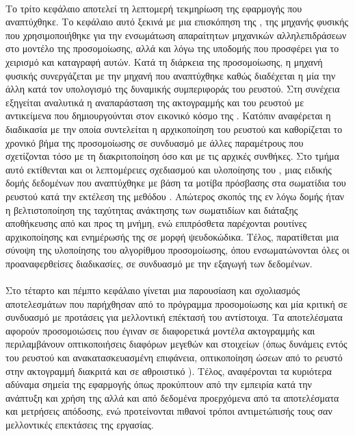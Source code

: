 \paragraph{} Το τρίτο κεφάλαιο αποτελεί τη λεπτομερή τεκμηρίωση της εφαρμογής που
αναπτύχθηκε. Το κεφάλαιο αυτό ξεκινά με μια επισκόπηση της , της μηχανής
φυσικής που χρησιμοποιήθηκε για την ενσωμάτωση απαραίτητων μηχανικών αλληλεπιδράσεων στο
μοντέλο της προσομοίωσης, αλλά και λόγω της υποδομής που προσφέρει για το χειρισμό και
καταγραφή αυτών. Κατά τη διάρκεια της προσομοίωσης, η μηχανή φυσικής συνεργάζεται με την
μηχανή  που αναπτύχθηκε καθώς διαδέχεται η μία την άλλη κατά τον υπολογισμό της
δυναμικής συμπεριφοράς του ρευστού. Στη συνέχεια εξηγείται αναλυτικά η αναπαράσταση της
ακτογραμμής και του ρευστού με αντικείμενα που δημιουργούνται στον εικονικό κόσμο της
. Κατόπιν αναφέρεται η διαδικασία με την οποία συντελείται η αρχικοποίηση του
ρευστού και καθορίζεται το χρονικό βήμα της προσομοίωσης σε συνδυασμό με άλλες παραμέτρους
που σχετίζονται τόσο με τη διακριτοποίηση όσο και με τις αρχικές συνθήκες. Στο τμήμα αυτό
εκτίθενται και οι λεπτομέρειες σχεδιασμού και υλοποίησης του , μιας ειδικής
δομής δεδομένων που αναπτύχθηκε με βάση τα μοτίβα πρόσβασης στα σωματίδια του ρευστού κατά
την εκτέλεση της μεθόδου . Απώτερος σκοπός της εν λόγω δομής ήταν η
βελτιστοποίηση της ταχύτητας ανάκτησης των σωματιδίων και διάταξης αποθήκευσης από και
προς τη μνήμη, ενώ επιπρόσθετα παρέχονται ρουτίνες αρχικοποίησης και ενημέρωσής της σε
μορφή ψευδοκώδικα. Τέλος, παρατίθεται μια σύνοψη της υλοποίησης του αλγορίθμου
προσομοίωσης, όπου ενσωματώνονται όλες οι προαναφερθείσες διαδικασίες, σε συνδυασμό με την
εξαγωγή των δεδομένων.

\paragraph{} Στο τέταρτο και πέμπτο κεφάλαιο γίνεται μια παρουσίαση και σχολιασμός
αποτελεσμάτων που παρήχθησαν από το πρόγραμμα προσομοίωσης και μία κριτική σε συνδυασμό με
προτάσεις για μελλοντική επέκτασή του αντίστοιχα. Τα αποτελέσματα αφορούν προσομοιώσεις
που έγιναν σε διαφορετικά μοντέλα ακτογραμμής και περιλαμβάνουν οπτικοποιήσεις διαφόρων
μεγεθών και στοιχείων (όπως δυνάμεις εντός του ρευστού και ανακατασκευασμένη επιφάνεια,
οπτικοποίηση ώσεων από το ρευστό στην ακτογραμμή διακριτά και σε αθροιστικό
). Τέλος, αναφέρονται τα κυριότερα αδύναμα σημεία της εφαρμογής όπως
προκύπτουν από την εμπειρία κατά την ανάπτυξη και χρήση της αλλά και από δεδομένα
προερχόμενα από τα αποτελέσματα και μετρήσεις απόδοσης, ενώ προτείνονται πιθανοί τρόποι
αντιμετώπισής τους σαν μελλοντικές επεκτάσεις της εργασίας.

